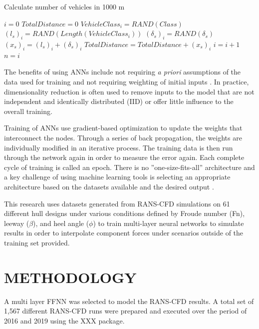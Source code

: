 \documentclass[10pt,a4paper,twocolumn]{article}
\begin{document}
\begin{algorithm}
\caption{Calculate number of vehicles in 1000 m}
\label{alg:vehcount}
\begin{algorithmic}
\State $i=0$
\State $TotalDistance=0$
\State $VehicleClass_{i} = RAND(Class)$
\State $(l_{s})_{i} = RAND(Length(VehicleClass_{i}))$
\State $(\delta_{s})_{i} = RAND(\delta_{s})$
\State $(x_{s})_{i} =  (l_{s})_{i} + (\delta_{s})_{i}$
\State $TotalDistance = TotalDistance + (x_{s})_{i}$
\State $i = i + 1$
\EndWhile
\State $n = i$
\end{algorithmic}
\end{algorithm}

The benefits of using ANNs include not requiring \textit{a priori} assumptions of the data used for training and not requiring weighting of initial inputs \cite{Gardner1998}. In practice, dimensionality reduction is often used to remove inputs to the model that are not independent and identically distributed (IID) or offer little influence to the overall training. 

Training of ANNs use gradient-based optimization to update the weights that interconnect the nodes. Through a series of back propagation, the weights are individually modified in an iterative process. The training data is then run through the network again in order to measure the error again. Each complete cycle of training is called an epoch. There is no ''one-size-fits-all'' architecture and a key challenge of using machine learning tools is selecting an appropriate architecture based on the datasets available and the desired output \cite{Wolpert1997}.

This research uses datasets generated from RANS-CFD simulations on 61 different hull designs under various conditions defined by Froude number (Fn), leeway ($\beta$), and heel angle ($\phi$) to train multi-layer neural networks to simulate results in order to interpolate component forces under scenarios outside of the training set provided. 


 
\section{METHODOLOGY}

A multi layer FFNN was selected to model the RANS-CFD results. A total set of 1,567 different RANS-CFD runs were prepared and executed over the period of 2016 and 2019 using the XXX package. 
\end{document}
